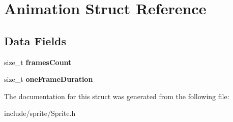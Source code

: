 \hypertarget{struct_animation}{}\section{Animation Struct Reference}
\label{struct_animation}
\subsection*{Data Fields}
\begin{DoxyCompactItemize}
\item 
\hypertarget{struct_animation_ace242ca3529b4a5ac307484da8872fd1}{}\label{struct_animation_ace242ca3529b4a5ac307484da8872fd1} 
size\+\_\+t {\bfseries frames\+Count}
\item 
\hypertarget{struct_animation_a4890c8e40c8a418c675673efc57e86b9}{}\label{struct_animation_a4890c8e40c8a418c675673efc57e86b9} 
size\+\_\+t {\bfseries one\+Frame\+Duration}
\end{DoxyCompactItemize}


The documentation for this struct was generated from the following file\+:\begin{DoxyCompactItemize}
\item 
include/sprite/Sprite.\+h\end{DoxyCompactItemize}

